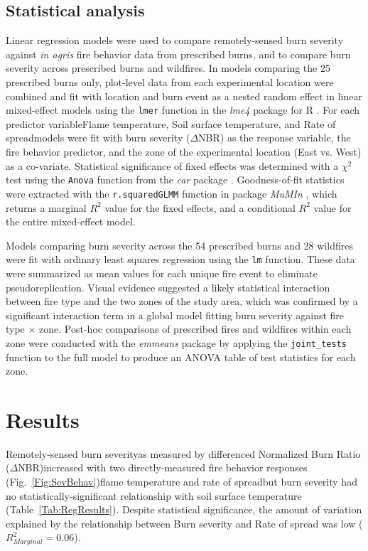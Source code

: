 \documentclass[fire,article,submit,oneauthor,pdftex]{Definitions/mdpi}
\begin{document}
\subsection{Statistical analysis} 

Linear regression models were used to compare remotely-sensed burn severity against \emph{in agris} fire behavior data from prescribed burns, and to compare burn severity across prescribed burns and wildfires. 
In models comparing the 25 prescribed burns only, plot-level data from each experimental location were combined and fit with location and burn event as a nested random effect in linear mixed-effect models using  the \texttt{lmer} function in the \emph{lme4} package for \textsf{R} \cite{bates2015}. 
For each predictor variable\textemdash Flame temperature, Soil surface temperature, and Rate of spread\textemdash models were fit with burn severity ($\Delta$NBR) as the response variable, the fire behavior predictor, and the zone of the experimental location (East vs. West) as a co-variate.
Statistical significance of fixed effects was determined with a $\chi^{2}$ test using the \texttt{Anova} function from the \emph{car} package \cite{fox2019a}. 
Goodness-of-fit statistics were extracted with the \texttt{r.squaredGLMM} function in package \emph {MuMIn} \cite{barton2026}, which returns a marginal $R^2$ value for the fixed effects, and a conditional $R^2$ value for the entire mixed-effect model. 

Models comparing burn severity across the 54 prescribed burns and 28 wildfires were fit with ordinary least squares regression using the \texttt{lm} function. 
These data were summarized as mean values for each unique fire event to eliminate pseudoreplication. 
Visual evidence suggested a likely statistical interaction between fire type and the two zones of the study area, which was confirmed by a significant interaction term in a global model fitting burn severity against fire type $\times$ zone.
Post-hoc comparisons of prescribed fires and wildfires within each zone were conducted with the \emph{emmeans} package \cite{lenth2018} by applying the \texttt{joint\_tests} function to the full model to produce an ANOVA table of test statistics for each zone. 

\section{Results} 

Remotely-sensed burn severity\textemdash as measured by differenced Normalized Burn Ratio ($\Delta$NBR)\textemdash increased with two directly-measured fire behavior responses (Fig.~\ref{Fig:SevBehav})\textemdash flame temperature and rate of spread\textemdash but burn severity had no statistically-significant relationship with soil surface temperature (Table~\ref{Tab:RegResults}). 
Despite statistical significance, the amount of variation explained by the relationship between Burn severity and Rate of spread was low ($R^{2}_{Marginal}=0.06$).
\end{document}
